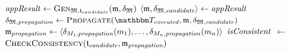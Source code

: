 \begin{algorithm}
\begin{algorithmic}[1]
         \label{algo:orchestration:provenance:line:loop_start}
            \State $\mathit{appResult} \gets \textsc{Gen}_{\mathfrak{M}, \mathfrak{t}_{candidate}}(\mathfrak{m}, \mathfrak{\delta}_{\mathfrak{M}})$ \label{algo:orchestration:provenance:line:first_execution}
                \State \Return{$\bot$} \label{algo:orchestration:provenance:line:bot_application}
            \EndIf
            \State $\langle \mathfrak{m}, \mathfrak{\delta}_{\mathfrak{M},\mathit{candidate}} \rangle \gets \mathit{appResult}$
            \State $\changetuple{\metamodeltuple{M},\mathvariable{propagation}} \gets \function{Propagate}(\provalgexecuted, \modeltuple{m}, \changetuple{\metamodeltuple{M},\mathvariable{candidate}})$ \label{algo:orchestration:provenance:line:recursive_call}
                \State \Return{$\bot$} \label{algo:orchestration:provenance:line:bot_recursion}
            \EndIf
            \State $\mathfrak{m}_{\mathit{propagation}} \gets \langle \delta_{M_{1},\mathit{propagation}}(m_{1}), \dots, \delta_{M_{n},\mathit{propagation}}(m_{n}) \rangle$
            \State $\mathit{isConsistent}$ $\leftarrow$ $\textsc{CheckConsistency}(\mathfrak{t}_{\mathit{candidate}}, \mathfrak{m}_{\mathit{propagation}})$
             \label{algo:orchestration:provenance:line:bot_failcheck}
                \State \Return{$\bot$} \label{algo:orchestration:provenance:line:bot_nonreactiveconverging}
            \EndIf

\end{algorithmic}
\end{algorithm}

